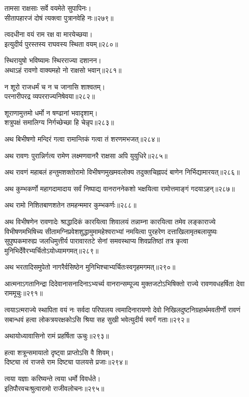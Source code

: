 \begin{flushleft}
तामसा राक्षसाः सर्वे वयमेते सुपापिनः।\\
सीतापहारजं दोषं त्यक्त्वा पुत्रानवेहि नः॥२७९॥

त्वदधीना वयं राम रक्ष वा मारयेच्छया।\\
इत्युदीर्य पुरस्तस्य राघवस्य स्थिता वयम्॥२८०॥

स्थिरायुषो भविष्यामः स्थिरराज्या दशानन।\\
अथाऽहं रावणो वाक्यमहो नो राक्षसो भवान्॥२८१॥

न शूरो राजधर्मं च न च जानासि शाश्वतम्।\\
परनारीपरद्र व्यपरराज्यनिषेवया॥२८२॥

शूराणामुत्तमो धर्मो न षण्ढानां भवादृशाम्।\\
शत्रुपक्षं समालिग्य निर्गच्छेच्छा हि चेन्नृप॥२८३॥

अथ बिभीषणो मन्दिरं गत्वा रामान्तिकं गत्वा तं शरणमभजत्॥२८४॥

अथ रावणः पुरान्निर्गत्य रामेण लक्ष्मणवानरै राक्षसा अपि युयुधिरे॥२८५॥

अथ रावणं महाबलं हन्तुमशक्तोरामो विभीषणमुखमवलोक्य तदुक्तचिह्नपदं बाणेन निर्भिद्यामारयत्॥२८६॥

अथ कुम्भकर्णो महागदामादाय सर्वं निष्पाद्य वानराननेकशो भक्षयित्वा रामोत्तमाङ्गं गदयाऽहन्॥२८७॥

अथ रामो निशितबाणशतेन तमहन्ममार कुम्भकर्णः॥२८८॥

अथ विभीषणेन रावणादेः श्राद्धादिकं कारयित्वा शिवालयं तन्नाम्ना कारयित्वा तमेव लङ्काराज्ये विभीषणमभिषिच्य सीतामग्निप्रवेशशुद्धामुमामहेश्वराभ्यां नमयित्वा पुरहरेण दत्ताखिलामृतबलायुष्यः सुपुष्पकमारुह्य जलधिमुत्तीर्य पारावारतटे सेनां समवस्थाप्य शिवप्रतिष्ठां तत्र कृत्वा मुनिभिर्देवैरभ्यर्चितोऽयोध्यामगमत्॥२८९॥

अथ भरतादिसमुपेतो नागरैर्वसिष्ठेन मुनिभिश्चाभ्यर्चितःस्वगृहमगमत्॥२९०॥

आत्मनाऽगतानिन्द्रा दिदेवानासनादिनाऽभ्यर्च्य वानरान्सम्पूज्य मुक्तजटोऽभिषिक्तो राज्ये रावणवधहर्षिता देवा राममूचुः॥२९१॥

त्वयाऽत्मराज्ये स्थापिता वयं नः सर्वदा परिपालय त्वमादिनारायणो देवो निखिलदुष्टनिग्रहार्थमवतीर्णो रावणं सबान्धवं हत्वा लोकत्रयरक्षकोऽसि श्रिया सह सुखी भवेत्युदीर्य स्वर्गं गताः॥२९२॥

अथायोध्यावासिनो रामं प्रहर्षिता ऊचुः॥२९३॥

हत्वा शत्रून्समायातो दृष्ट्वा प्राप्तोऽसि वै शिवम्।\\
दिष्ट्या त्वं राजसे राम दिष्ट्या पालयसे प्रजाः॥२९४॥

त्वया यज्ञाः करिष्यन्ते त्वया धर्मो विवर्धते।\\
इतिपौरवचःश्रुत्वारामो राजीवलोचनः॥२९५॥


\end{flushleft}
